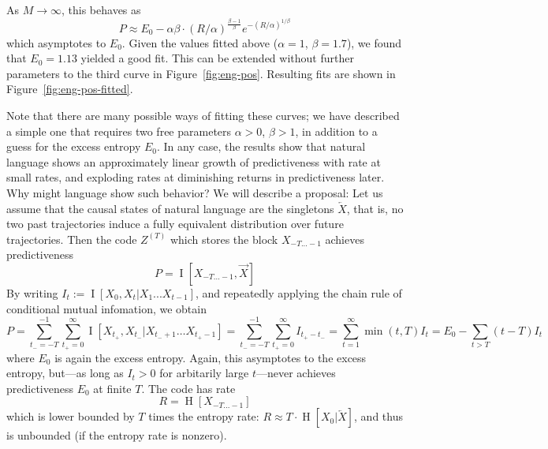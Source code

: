 \documentclass[11pt,letterpaper]{article}
\newif \ifcomment
\newcommand\rljf[1]{\ifcomment{{\color{blue}(#1)}}\else{}\fi}
\begin{document}
As $M \rightarrow \infty$, this behaves as
\begin{equation}
	P \approx E_0 - \alpha\beta \cdot (R/\alpha)^{\frac{\beta-1}{\beta}} e^{-(R/\alpha)^{1/\beta}}
\end{equation}
which asymptotes to $E_0$.
Given the values fitted above ($\alpha=1$, $\beta=1.7$), we found that $E_0 = 1.13$ yielded a good fit.
This can be extended without further parameters to the third curve in Figure~\ref{fig:eng-pos}.
Resulting fits are shown in Figure~\ref{fig:eng-pos-fitted}.

Note that there are many possible ways of fitting these curves; we have described a simple one that requires two free parameters $\alpha >0$, $\beta > 1$, in addition to a guess for the excess entropy $E_0$.
In any case, the results show that natural language shows an approximately linear growth of predictiveness with rate at small rates, and exploding rates at diminishing returns in predictiveness later.
Why might language show such behavior?
We will describe a proposal:
Let us assume that the causal states of natural language are the singletons $\overleftarrow{X}$, that is, no two past trajectories induce a fully equivalent distribution over future trajectories.
Then the code $Z^{(T)}$ which stores the block $X_{-T...-1}$ achieves predictiveness \rljf{Write out what the min is doing logically: when $t$ exceeds $T$ we multiply only by $T$ (I'm not sure why). Also maybe subscript $P_T$}
\begin{equation}
	P =	\operatorname{I}[X_{-T...-1}, \overrightarrow{X}]
\end{equation}
By writing $I_t := \operatorname{I}[X_0, X_t | X_1 ... X_{t-1}]$, and repeatedly applying the chain rule of conditional mutual infomation, we obtain
\begin{equation}
	P = \sum_{t_- = -T}^{-1} \sum_{t_+ = 0}^\infty \operatorname{I}[X_{t_+},X_{t_-}|X_{t_-+1}\dots X_{t_+-1}] = \sum_{t_- = -T}^{-1} \sum_{t_+ = 0}^\infty I_{t_+-t_-}  = \sum_{t=1}^\infty \min(t,T) I_t = E_0 - \sum_{t > T} (t-T) I_t
\end{equation}
where $E_0$ is again the excess entropy.
Again, this asymptotes to the excess entropy, but---as long as $I_t > 0$ for arbitarily large $t$---never achieves predictiveness $E_0$ at finite $T$.
The code has rate
\begin{equation}
	R =	\operatorname{H}[X_{-T...-1}]
\end{equation}
which is lower bounded by $T$ times the entropy rate: $R \approx T \cdot \operatorname{H}[X_0|\overleftarrow{X}]$, and thus is unbounded (if the entropy rate is nonzero).
\end{document}
